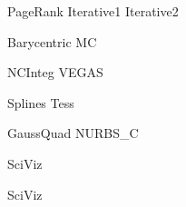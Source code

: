\documentclass{newsiambook}
\begin{document}
{PageRank}
{Iterative1}
{Iterative2}






{Barycentric}
{MC}

{NCInteg}
{VEGAS}

{Splines}
{Tess}

{GaussQuad}
{NURBS_C}


\begin{matlab}
{SciViz}
\end{matlab}

\begin{python}
{SciViz}
\end{python}
\end{document}
